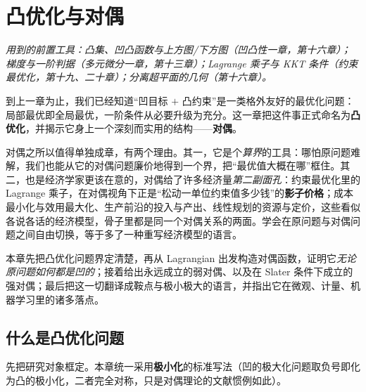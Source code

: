 \chapter{凸优化与对偶}
\label{ch:duality}

\noindent\emph{用到的前置工具：凸集、凹凸函数与上方图/下方图（凹凸性一章，第十六章）；梯度与一阶判据（多元微分一章，第十三章）；Lagrange 乘子与 KKT 条件（约束最优化，第十九、二十章）；分离超平面的几何（第十六章）。}
\medskip

到上一章为止，我们已经知道``凹目标 $+$ 凸约束''是一类格外友好的最优化问题：局部最优即全局最优，一阶条件从必要升级为充分。这一章把这件事正式命名为\textbf{凸优化}，并揭示它身上一个深刻而实用的结构——\textbf{对偶}。

对偶之所以值得单独成章，有两个理由。其一，它是个\emph{算界}的工具：哪怕原问题难解，我们也能从它的对偶问题廉价地得到一个界，把``最优值大概在哪''框住。其二，也是经济学家更该在意的，对偶给了许多经济量\emph{第二副面孔}：约束最优化里的 Lagrange 乘子，在对偶视角下正是``松动一单位约束值多少钱''的\textbf{影子价格}；成本最小化与效用最大化、生产前沿的投入与产出、线性规划的资源与定价，这些看似各说各话的经济模型，骨子里都是同一个对偶关系的两面。学会在原问题与对偶问题之间自由切换，等于多了一种重写经济模型的语言。

本章先把凸优化问题界定清楚，再从 Lagrangian 出发构造对偶函数，证明它\emph{无论原问题如何都是凹的}；接着给出永远成立的弱对偶、以及在 Slater 条件下成立的强对偶；最后把这一切翻译成鞍点与极小极大的语言，并指出它在微观、计量、机器学习里的诸多落点。

\section{什么是凸优化问题}
\label{sec:duality-1}

先把研究对象框定。本章统一采用\textbf{极小化}的标准写法（凹的极大化问题取负号即化为凸的极小化，二者完全对称，只是对偶理论的文献惯例如此）。


